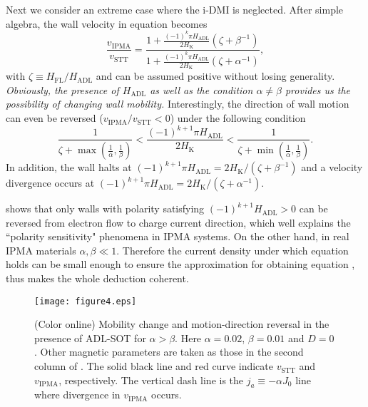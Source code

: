 \documentclass[12pt]{iopart}
\begin{document}
Next we consider an extreme case where the i-DMI is neglected.
After simple algebra, the wall velocity in equation  becomes
\begin{equation}\label{vt_FL_and_ADL_SOTs}
\frac{v_{\mathrm{IPMA}}}{v_{\mathrm{STT}}}=\frac{1+\frac{(-1)^k\pi H_{\mathrm{ADL}}}{2 H_{\mathrm{K}}}\left(\zeta+\beta^{-1}\right)}{1+\frac{(-1)^k\pi H_{\mathrm{ADL}}}{2 H_{\mathrm{K}}}\left(\zeta+\alpha^{-1}\right)},
\end{equation}
with $\zeta\equiv H_{\mathrm{FL}}/H_{\mathrm{ADL}}$ and can be assumed positive without losing generality.
{\it Obviously, the presence of $H_{\mathrm{ADL}}$ as well as the condition $\alpha\ne\beta$
provides us the possibility of changing wall mobility.}
Interestingly, the direction of wall motion can even be reversed ($v_{\mathrm{IPMA}}/v_{\mathrm{STT}}<0$)
under the following condition
\begin{equation}\label{v_reversal_1_FL_and_ADL_SOTs}
\frac{1}{\zeta+\max(\frac{1}{\alpha},\frac{1}{\beta})}<\frac{(-1)^{k+1}\pi H_{\mathrm{ADL}}}{2 H_{\mathrm{K}}}<\frac{1}{\zeta+\min(\frac{1}{\alpha},\frac{1}{\beta})}.
\end{equation}
In addition, the wall halts at $(-1)^{k+1}\pi H_{\mathrm{ADL}}=2 H_{\mathrm{K}}/(\zeta+\beta^{-1})$
and a velocity divergence occurs at $(-1)^{k+1}\pi H_{\mathrm{ADL}}=2 H_{\mathrm{K}}/(\zeta+\alpha^{-1})$.

 shows that only walls with polarity satisfying $(-1)^{k+1}H_{\mathrm{ADL}}>0$
can be reversed from electron flow to charge current direction, which well
explains the ``polarity sensitivity" phenomena in IPMA systems.
On the other hand, in real IPMA materials $\alpha,\beta\ll 1$.
Therefore the current density under which equation  holds
can be small enough to ensure the approximation for obtaining equation ,
thus makes the whole deduction coherent.

\begin{figure}[htbp]
	\centering
	\texttt{[image: figure4.eps]}
	\caption{(Color online) Mobility change and motion-direction reversal in the presence of
		ADL-SOT for $\alpha>\beta$. Here $\alpha=0.02$, $\beta=0.01$ and $D=0$. Other
		magnetic parameters are taken as those in the second column of .
		The solid black line and red curve indicate $v_{\mathrm{STT}}$ and $v_{\mathrm{IPMA}}$,
		respectively. The vertical dash line is the $j_a\equiv -\alpha J_0$ line where
		divergence in $v_{\mathrm{IPMA}}$ occurs.}\label{fig4}
\end{figure}
\end{document}
